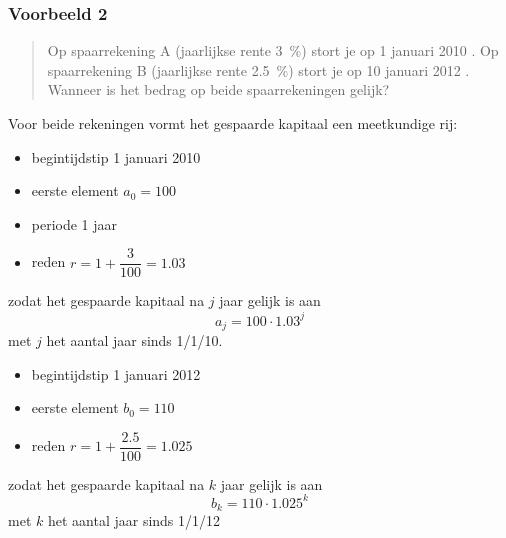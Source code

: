 \subsubsection{Voorbeeld 2}
\begin{quote}
Op spaarrekening A (jaarlijkse rente \SI{3}{\percent}) stort je op 1 januari 2010 . Op spaarrekening B (jaarlijkse rente \SI{2,5}{\percent}) stort je op 10 januari 2012 . Wanneer is het bedrag op beide spaarrekeningen gelijk?
\end{quote}
\noindent
Voor beide rekeningen vormt het gespaarde kapitaal een meetkundige rij:
\begin{multicols}{2}
\begin{itemize}
\item begintijdstip 1 januari 2010
\item eerste element $a_0=100$
\item periode 1 jaar
\item reden $r=1+\dfrac{3}{100}=\num{1.03}$
\end{itemize}
zodat het gespaarde kapitaal na $j$ jaar gelijk is aan 
\begin{equation}
a_j=100\cdot \num{1.03}^j
\label{eq:sam_intrest_vb2a}
\end{equation}
met $j$ het aantal jaar sinds 1/1/10.
\begin{itemize}
\item begintijdstip 1 januari 2012
\item eerste element $b_0=110$
\item reden $r=1+\dfrac{\num{2.5}}{100}=\num{1.025}$
\end{itemize}
zodat het gespaarde kapitaal na $k$ jaar gelijk is aan 
\begin{equation}
b_k=110\cdot \num{1.025}^k
\label{eq:sam_intrest_vb2b}
\end{equation}
met $k$ het aantal jaar sinds 1/1/12

\end{multicols}
